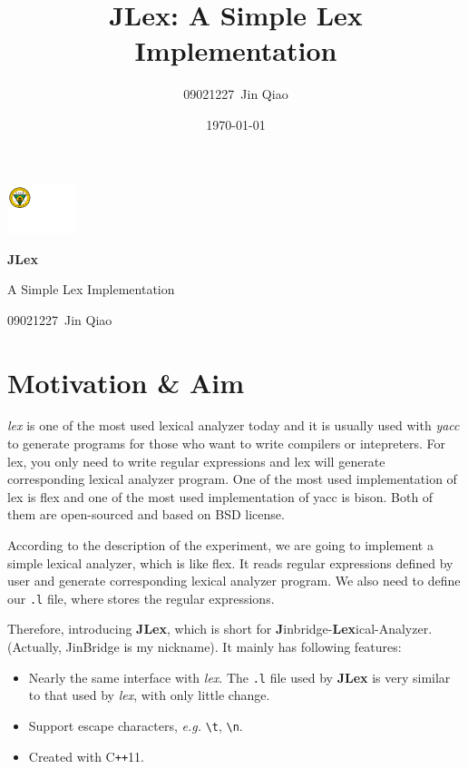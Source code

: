 \documentclass{article}
\title{JLex: A Simple Lex Implementation}
\author{09021227~Jin Qiao}
\date{\today}
\begin{document}
\begin{titlepage}
    \hfill\includegraphics[width=2cm]{img/seu-logo.pdf}

    \vspace*{8cm}

    {\huge\textbf{JLex}}

    \vspace*{0.5em}

    {\Large{A Simple Lex Implementation}}

    \vspace*{1em}

    {\large {09021227~Jin Qiao}}
\end{titlepage}

\tableofcontents
\newpage

\section{Motivation \& Aim}

\textit{lex} is one of the most used lexical analyzer today and it is usually used with \textit{yacc} to generate programs for those who want to write compilers or intepreters. For lex, you only need to write regular expressions and lex will generate corresponding lexical analyzer program. One of the most used implementation of lex is flex and one of the most used implementation of yacc is bison. Both of them are open-sourced and based on BSD license.

According to the description of the experiment, we are going to implement a simple lexical analyzer, which is like flex. It reads regular expressions defined by user and generate corresponding lexical analyzer program. We also need to define our \texttt{.l} file, where stores the regular expressions.

Therefore, introducing \textbf{JLex}, which is short for \textbf{J}inbridge-\textbf{Lex}ical-Analyzer. (Actually, JinBridge is my nickname). It mainly has following features:

\begin{itemize}
    \item Nearly the same interface with \textit{lex}. The \texttt{.l} file used by \textbf{JLex} is very similar to that used by \textit{lex}, with only little change.
    \item Support escape characters, \textit{e.g.} \texttt{\textbackslash t}, \texttt{\textbackslash n}.
    \item Created with C\texttt{++}11.
\end{itemize}
\end{document}
